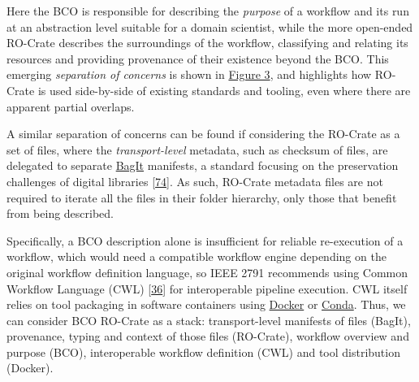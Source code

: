 Here the BCO is responsible for describing the \emph{purpose} of a
workflow and its run at an abstraction level suitable for a domain
scientist, while the more open-ended RO-Crate describes the surroundings
of the workflow, classifying and relating its resources and providing
provenance of their existence beyond the BCO. This emerging
\emph{separation of concerns} is shown in
\protect\hyperlink{fig:sep_concerns}{Figure 3}, and highlights how
RO-Crate is used side-by-side of existing standards and tooling, even
where there are apparent partial overlaps.

A similar separation of concerns can be found if considering the
RO-Crate as a set of files, where the \emph{transport-level} metadata,
such as checksum of files, are delegated to separate
\href{https://www.researchobject.org/ro-crate/1.1/appendix/implementation-notes.html\#adding-ro-crate-to-bagit}{BagIt}
manifests, a standard focusing on the preservation challenges of digital
libraries {[}\href{https://doi.org/10.17487/rfc8493}{74}{]}. As such,
RO-Crate metadata files are not required to iterate all the files in
their folder hierarchy, only those that benefit from being described.

Specifically, a BCO description alone is insufficient for reliable
re-execution of a workflow, which would need a compatible workflow
engine depending on the original workflow definition language, so IEEE
2791 recommends using Common Workflow Language (CWL)
{[}\href{https://arxiv.org/abs/2105.07028}{36}{]} for interoperable
pipeline execution. CWL itself relies on tool packaging in software
containers using \href{https://www.docker.com/}{Docker} or
\href{https://docs.conda.io/}{Conda}. Thus, we can consider BCO RO-Crate
as a stack: transport-level manifests of files (BagIt), provenance,
typing and context of those files (RO-Crate), workflow overview and
purpose (BCO), interoperable workflow definition (CWL) and tool
distribution (Docker).

